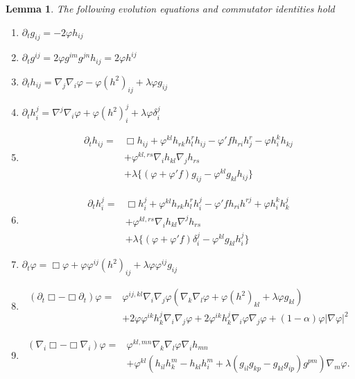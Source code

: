 \documentclass{amsart}
\newtheorem{lemma}[theorem]{Lemma}
\theoremstyle{definition}
\theoremstyle{remark}
\numberwithin{equation}{section}
\begin{document}
\begin{lemma}
The following evolution equations and commutator identities hold
\begin{enumerate}
  \item $\partial_tg_{ij}=-2\varphi h_{ij}$
  \item $\partial_tg^{ij}=2\varphi g^{im}g^{jn}h_{ij}=2\varphi h^{ij}$
    \item $\partial_t h_{ij}=\nabla_j\nabla_i\varphi-\varphi(h^2)_{ij}+\lambda \varphi g_{ij}$
  \item $\partial_t h_i^j=\nabla^j\nabla_i\varphi+\varphi(h^2)_i^j+\lambda \varphi\delta_i^j$
  \item \begin{align*}
\partial_t h_{ij}=&\Box h_{ij}+\varphi^{kl}h_{rk}h_l^rh_{ij}-\varphi'fh_{ri}h_j^r-\varphi h_i^kh_{kj}\\
&+\varphi^{kl,rs}\nabla_ih_{kl}\nabla_jh_{rs}\\
&+\lambda \{(\varphi+\varphi'f)g_{ij}-\varphi^{kl}g_{kl}h_{ij}\}
\end{align*}
  \item \begin{align*}
\partial_t h_i^j=&\Box h_i^j+\varphi^{kl}h_{rk}h_l^rh_i^j-\varphi'fh_{ri}h^{rj}+\varphi h_i^kh_k^j\\
&+\varphi^{kl,rs}\nabla_ih_{kl}\nabla^jh_{rs}\\
&+\lambda \{(\varphi+\varphi'f)\delta_i^j-\varphi^{kl}g_{kl}h_i^j\}
\end{align*}
  \item $\partial_t \varphi=\Box \varphi+\varphi\varphi^{ij}(h^2)_{ij}+\lambda \varphi\varphi^{ij}g_{ij}$
  \item \begin{align*}
(\partial_t\Box-\Box\partial_t)\varphi=&\varphi^{ij,kl}\nabla_i\nabla_j\varphi(\nabla_k\nabla_l\varphi+\varphi(h^2)_{kl}+\lambda \varphi g_{kl})\\
&+2\varphi\varphi^{ik}h_k^j\nabla_i\nabla_j\varphi+2\varphi^{ik}h_k^j\nabla_i\varphi\nabla_j\varphi+(1-\alpha)\varphi|\nabla \varphi|^2
\end{align*}
\item \begin{align*}
(\nabla_i\Box-\Box\nabla_i)\varphi=&\varphi^{kl,mn}\nabla_k\nabla_l\varphi\nabla_ih_{mn}\\
&+\varphi^{kl}(h_{il}h_k^m-h_{kl}h_i^m+\lambda(g_{il}g_{kp}-g_{kl}g_{ip})g^{pm})\nabla_m\varphi.
\end{align*}
\end{enumerate}
\end{lemma}
\end{document}
